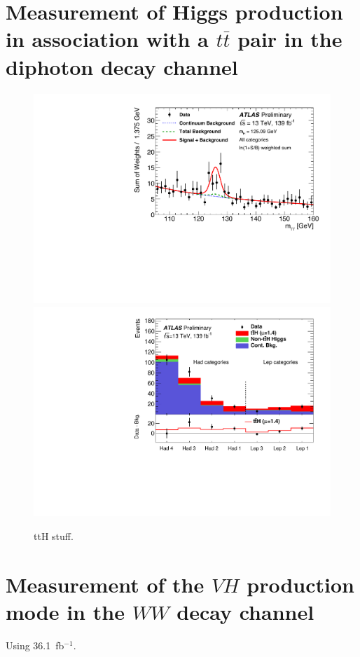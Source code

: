 \documentclass{moriond}
\begin{document}
\section{Measurement of Higgs production in association with a $t\bar t$ pair in the diphoton decay channel}\label{sec:ttH_yy}

\begin{figure}[!htbp]
\centering
\includegraphics[width=0.525\linewidth]{figures/ATLAS-CONF-2019-004/fig_05_v1.pdf}
\includegraphics[width=0.465\linewidth]{figures/ATLAS-CONF-2019-004/fig_08.pdf}
\caption{
  ttH stuff.
}
\label{fig:vh_bb}
\end{figure}

\section{Measurement of the $VH$ production mode in the $WW$ decay channel} \label{sec:vh_ww}

Using 36.1~fb$^{-1}$.
\end{document}
